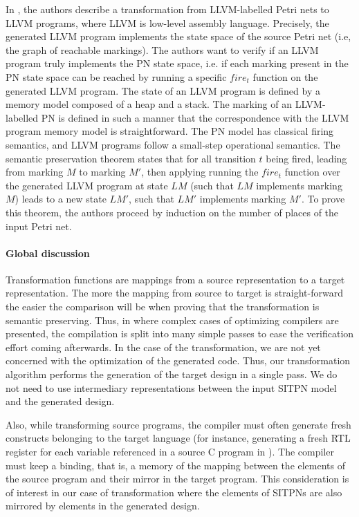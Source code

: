 \documentclass[pdflatex,sn-mathphys]{sn-jnl}%
\theoremstyle{thmstyleone}%
\theoremstyle{thmstyletwo}%
\theoremstyle{thmstylethree}%
\begin{document}
In \cite{Fronc2011}, the authors describe a transformation from
LLVM-labelled Petri nets to LLVM programs, where LLVM is low-level
assembly language. Precisely, the generated LLVM program implements
the state space of the source Petri net (i.e, the graph of reachable
markings). The authors want to verify if an LLVM program truly
implements the PN state space, i.e. if each marking present in the PN
state space can be reached by running a specific $fire_t$ function on
the generated LLVM program. The state of an LLVM program is defined by
a memory model composed of a heap and a stack. The marking of an
LLVM-labelled PN is defined in such a manner that the correspondence
with the LLVM program memory model is straightforward. The PN model
has classical firing semantics, and LLVM programs follow a small-step
operational semantics. The semantic preservation theorem states that
for all transition $t$ being fired, leading from marking $M$ to
marking $M'$, then applying running the $fire_t$ function over the
generated LLVM program at state $LM$ (such that $LM$ implements
marking $M$) leads to a new state $LM'$, such that $LM'$ implements
marking $M'$. To prove this theorem, the authors proceed by induction
on the number of places of the input Petri net.


\paragraph{Global discussion}

Transformation functions are mappings from a source representation to
a target representation. The more the mapping from source to target is
straight-forward the easier the comparison will be when proving that
the transformation is semantic preserving. Thus, in
\cite{Leroy2009,Tan,Chlipala2010} where complex cases of optimizing
compilers are presented, the compilation is split into many simple
passes to ease the verification effort coming afterwards. In the case
of the \hilecop{} transformation, we are not yet concerned with the
optimization of the generated \vhdl{} code. Thus, our transformation
algorithm performs the generation of the target \hvhdl{} design in a
single pass. We do not need to use intermediary representations
between the input SITPN model and the generated \hvhdl{} design.

Also, while transforming source programs, the compiler must often
generate fresh constructs belonging to the target language (for
instance, generating a fresh RTL register for each variable referenced
in a source C program in \cite{Leroy2009}). The compiler must keep a
binding, that is, a memory of the mapping between the elements of the
source program and their mirror in the target program. This
consideration is of interest in our case of transformation where the
elements of SITPNs are also mirrored by elements in the generated
\hvhdl{} design.
\end{document}
